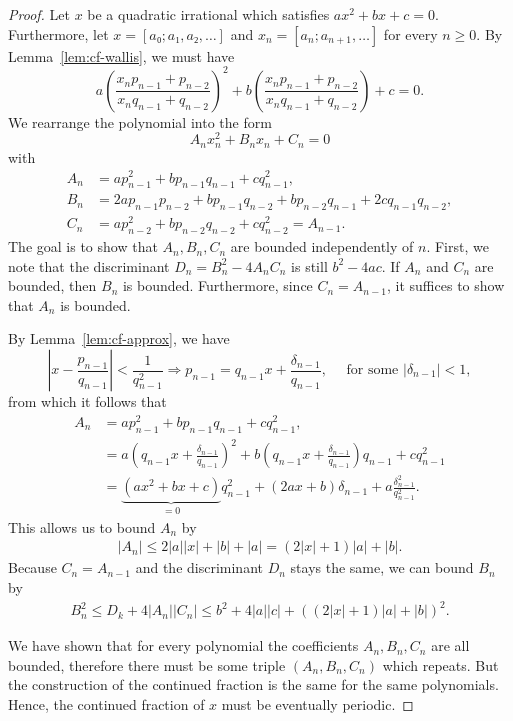 \begin{proof}
  Let $x$ be a quadratic irrational which satisfies $ax^2 + bx + c = 0$.
  Furthermore, let $x = [a₀; a₁, a₂, …]$ and $x_n = [a_n; a_{n+1}, …]$ for every $n ≥ 0$.
  By Lemma~\ref{lem:cf-wallis}, we must have
  \[
    a \left(\frac{x_n p_{n-1} + p_{n-2}}{x_n q_{n-1} + q_{n-2}}\right)^2
    + b \left(\frac{x_n p_{n-1} + p_{n-2}}{x_n q_{n-1} + q_{n-2}}\right)
    + c = 0.
  \]
  We rearrange the polynomial into the form
  \[
    A_n x_n^2 + B_n x_n + C_n = 0
  \]
  with
  \begin{align*}
    A_n & = a p_{n-1}^2 + b p_{n-1} q_{n-1} + c q_{n-1}^2, \\
    B_n & = 2a p_{n-1} p_{n-2} + b p_{n-1} q_{n-2} + b p_{n-2} q_{n-1} + 2c q_{n-1} q_{n-2}, \\
    C_n & = a p_{n-2}^2 + b p_{n-2} q_{n-2} + c q_{n-2}^2 = A_{n-1}.
  \end{align*}
  The goal is to show that $A_n, B_n, C_n$ are bounded independently of $n$.
  First, we note that the discriminant $D_n = B_n^2 - 4 A_n C_n$ is still $b^2 - 4ac$.
  If $A_n$ and $C_n$ are bounded, then $B_n$ is bounded.
  Furthermore, since $C_n = A_{n-1}$, it suffices to show that $A_n$ is bounded.

  By Lemma~\ref{lem:cf-approx}, we have
  \[
    \left| x - \frac{p_{n-1}}{q_{n-1}} \right| < \frac{1}{q_{n-1}^2}
    \Rightarrow
    p_{n-1} = q_{n-1} x + \frac{δ_{n-1}}{q_{n-1}}, \quad \text{ for some } |δ_{n-1}| < 1,
  \]
  from which it follows that
  \begin{align*}
    A_n & = a p_{n-1}^2 + b p_{n-1} q_{n-1} + c q_{n-1}^2, \\
    & = a \left( q_{n-1} x + \frac{δ_{n-1}}{q_{n-1}} \right)^2 + b \left( q_{n-1} x + \frac{δ_{n-1}}{q_{n-1}} \right) q_{n-1} + c q_{n-1}^2 \\
    & = \underbrace{(ax^2 + bx + c)}_{ = 0} q_{n-1}^2 + (2ax + b) δ_{n-1} + a \frac{δ_{n-1}^2}{q_{n-1}^2}.
  \end{align*}
  This allows us to bound $A_n$ by
  \begin{align*}
    |A_n| ≤ 2|a||x| + |b| + |a| = (2 |x| + 1) |a| + |b|.
  \end{align*}
  Because $C_n = A_{n-1}$ and the discriminant $D_n$ stays the same, we can
  bound $B_n$ by
  \begin{align*}
    B_n^2 ≤ D_k + 4 |A_n| |C_n| ≤ b^2 + 4 |a| |c| + ((2 |x| + 1)|a| + |b|)^2.
  \end{align*}

  We have shown that for every polynomial the coefficients $A_n, B_n, C_n$ are all bounded,
  therefore there must be some triple $(A_n, B_n, C_n)$ which repeats.
  But the construction of the continued fraction is the same for the same polynomials.
  Hence, the continued fraction of $x$ must be eventually periodic.
\end{proof}

